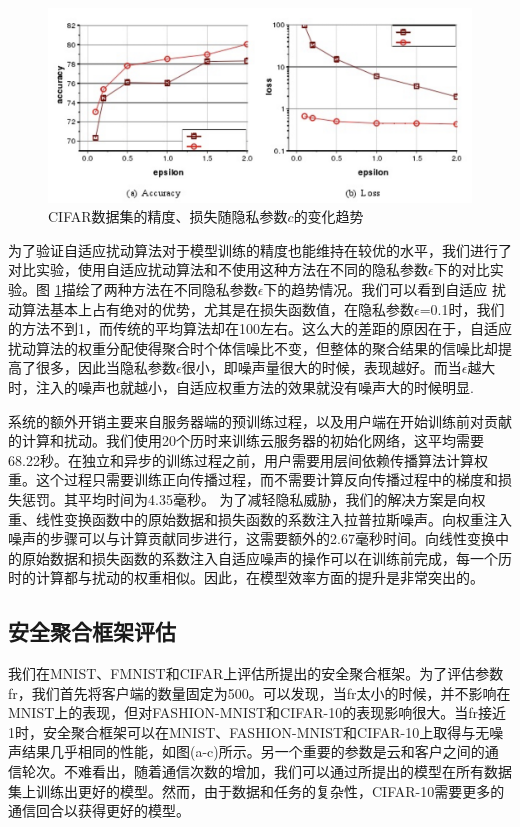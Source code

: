 \begin{figure}[!hbt]
\centering
  	\includegraphics[scale=0.6]{fig2/C5/cifar实验}%
	\caption{CIFAR数据集的精度、损失随隐私参数$c$的变化趋势}
  	\label{fig:CIFAR数据集的精度、损失随参数$c$的变化趋势} 
\end{figure}

为了验证自适应扰动算法对于模型训练的精度也能维持在较优的水平，我们进行了对比实验，使用自适应扰动算法和不使用这种方法在不同的隐私参数$\epsilon$下的对比实验。图 \ref{fig:CIFAR数据集的精度、损失随参数$c$的变化趋势}描绘了两种方法在不同隐私参数$\epsilon$下的趋势情况。我们可以看到自适应
扰动算法基本上占有绝对的优势，尤其是在损失函数值，在隐私参数$\epsilon$=0.1时，我们的方法不到1，而传统的平均算法却在100左右。这么大的差距的原因在于，自适应扰动算法的权重分配使得聚合时个体信噪比不变，但整体的聚合结果的信噪比却提高了很多，因此当隐私参数$\epsilon$很小，即噪声量很大的时候，表现越好。而当$\epsilon$越大时，注入的噪声也就越小，自适应权重方法的效果就没有噪声大的时候明显.

系统的额外开销主要来自服务器端的预训练过程，以及用户端在开始训练前对贡献的计算和扰动。我们使用20个历时来训练云服务器的初始化网络，这平均需要68.22秒。在独立和异步的训练过程之前，用户需要用层间依赖传播算法计算权重。这个过程只需要训练正向传播过程，而不需要计算反向传播过程中的梯度和损失惩罚。其平均时间为4.35毫秒。
为了减轻隐私威胁，我们的解决方案是向权重、线性变换函数中的原始数据和损失函数的系数注入拉普拉斯噪声。向权重注入噪声的步骤可以与计算贡献同步进行，这需要额外的2.67毫秒时间。向线性变换中的原始数据和损失函数的系数注入自适应噪声的操作可以在训练前完成，每一个历时的计算都与扰动的权重相似。因此，在模型效率方面的提升是非常突出的。

\subsection{安全聚合框架评估}
我们在MNIST、FMNIST和CIFAR上评估所提出的安全聚合框架。为了评估参数fr，我们首先将客户端的数量固定为500。可以发现，当fr太小的时候，并不影响在MNIST上的表现，但对FASHION-MNIST和CIFAR-10的表现影响很大。当fr接近1时，安全聚合框架可以在MNIST、FASHION-MNIST和CIFAR-10上取得与无噪声结果几乎相同的性能，如图(a-c)所示。另一个重要的参数是云和客户之间的通信轮次。不难看出，随着通信次数的增加，我们可以通过所提出的模型在所有数据集上训练出更好的模型。然而，由于数据和任务的复杂性，CIFAR-10需要更多的通信回合以获得更好的模型。


